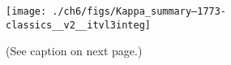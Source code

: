 
  \begin{figure}
    \centering
    \noindent\texttt{[image: ./ch6/figs/Kappa\_summary--1773-classics\_\_v2\_\_itvl3integ]}
    \caption[Inverted V precipitation and best-fit Maxwellian and kappa
    distribution parameters (Orbit 1773)]{(See caption on next page.)}
    \label{ch6:Fig1}
  \end{figure}
